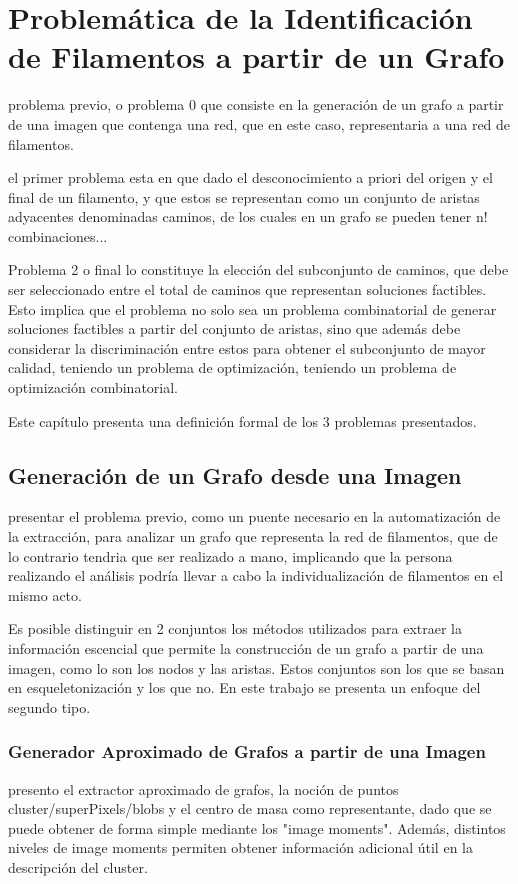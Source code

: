 \chapter{Problem\'atica de la Identificaci\'on de Filamentos a partir de un Grafo}
\label{chap:cap2}

problema previo, o problema 0 que consiste en la generaci\'on de un grafo a partir de una imagen que contenga una red, que en este caso, representaria a una red de filamentos. 

el primer problema esta en que dado el desconocimiento a priori del origen y el final de un filamento, y que estos se representan como un conjunto de aristas adyacentes denominadas caminos, de los cuales en un grafo se pueden tener n! combinaciones...

Problema 2 o final lo constituye la elecci\'on del subconjunto de caminos, que debe ser seleccionado entre el total de caminos que representan soluciones factibles. Esto implica que el problema no solo sea un problema combinatorial de generar soluciones factibles a partir del conjunto de aristas, sino que adem\'as debe considerar la discriminaci\'on entre estos para obtener el subconjunto de mayor calidad, teniendo un problema de optimizaci\'on, teniendo un problema de optimizaci\'on combinatorial.

Este cap\'itulo presenta una definici\'on formal de los 3 problemas presentados.

\section{Generaci\'on de un Grafo desde una Imagen}
presentar el problema previo, como un puente necesario en la 
automatizaci\'on de la extracci\'on,  para analizar un grafo que representa la red de filamentos, que de lo contrario tendria que ser realizado a mano, implicando que la persona realizando el análisis podría llevar a cabo la individualizaci\'on de filamentos en el mismo acto.

Es posible distinguir en 2 conjuntos los m\'etodos utilizados para extraer la informaci\'on escencial que permite la construcci\'on de un grafo a partir de una imagen, como lo son los nodos y las aristas. Estos conjuntos son los que se basan en esqueletonizaci\'on\cite{lavado2018comparacion} y los que no. En este trabajo se presenta un enfoque del segundo tipo.

\subsection{Generador Aproximado de Grafos a partir de una Imagen}
presento el extractor aproximado de grafos, la noción de puntos cluster/superPixels/blobs y el centro de masa como representante, dado que se puede obtener de forma simple mediante los "image moments". Además, distintos niveles de image moments permiten obtener información adicional útil en la descripción del cluster.


